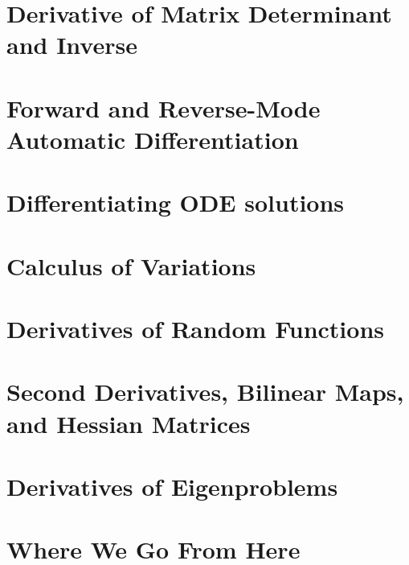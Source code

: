 \documentclass{article}
\begin{document}
\pagebreak
\section{Derivative of Matrix Determinant and Inverse}


\pagebreak

\section{Forward and Reverse-Mode Automatic Differentiation}
\label{sec:AD}


\pagebreak

\section{Differentiating ODE solutions}


\pagebreak

\section{Calculus of Variations}


\pagebreak

\section{Derivatives of Random Functions}


\pagebreak

\section[Second Derivatives, Bilinear Maps,
and Hessian Matrices]{Second Derivatives, Bilinear Maps, \\
and Hessian Matrices}
\label{sec:hessians}


\pagebreak
\section{Derivatives of Eigenproblems}

\pagebreak

\section{Where We Go From Here}

\end{document}
